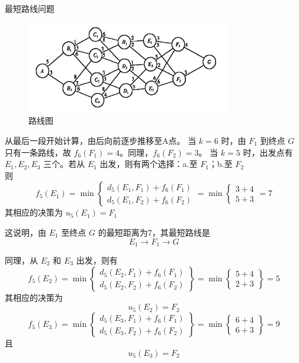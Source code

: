 \begin{exbox}{最短路线问题}{}
	\begin{figure}[H]
        \centering
        \includegraphics[width=0.8\textwidth]{./image/29.png}
        \caption{路线图}
        \label{fig:Chapter4_Temporary_Pavilion_1}
    \end{figure}
	从最后一段开始计算，由后向前逐步推移至A点。
	当 \( k = 6 \) 时，由 \( F_1 \) 到终点 \( G \) 只有一条路线，故 \( f_6(F_1) = 4 \)。同理，\( f_6(F_2) = 3 \)。
	当 \( k = 5 \) 时，出发点有 \( E_1, E_2, E_3 \) 三个。若从 \( E_1 \) 出发，则有两个选择：a.至 \( F_1 \)；b.至 \( F_2 \)
		\\则
		\[f_5(E_1) = \min 
		\begin{cases} 
		d_5(E_1, F_1) + f_6(F_1) \\
		d_5(E_1, F_2) + f_6(F_2)
		\end{cases}
		= \min
		\begin{cases} 
		3 + 4 \\
		5 + 3
		\end{cases}
		= 7\]
		其相应的决策为 \( u_5(E_1) = F_1 \)
		
		这说明，由 \( E_1 \) 至终点 \( G \) 的最短距离为7，其最短路线是  
		\[E_1 \rightarrow F_1 \rightarrow G\]  
		
		同理，从 \( E_2 \) 和 \( E_3 \) 出发，则有  
		\[f_5(E_2) = \min \left\{ \begin{array}{l} 
		d_5(E_2, F_1) + f_6(F_1) \\ 
		d_5(E_2, F_2) + f_6(F_2) 
		\end{array} \right\} = \min \left\{ \begin{array}{l} 
		5 + 4 \\ 
		2 + 3 
		\end{array} \right\} = 5\]  
		其相应的决策为  
		\[u_5(E_2) = F_2\]  
		\[f_5(E_3) = \min \left\{ \begin{array}{l} 
		d_5(E_3, F_1) + f_6(F_1) \\ 
		d_5(E_3, F_2) + f_6(F_2) 
		\end{array} \right\} = \min \left\{ \begin{array}{l} 
		6 + 4 \\ 
		6 + 3 
		\end{array} \right\} = 9\]  
		且  
		\[u_5(E_3) = F_2\]
		

\end{exbox}

